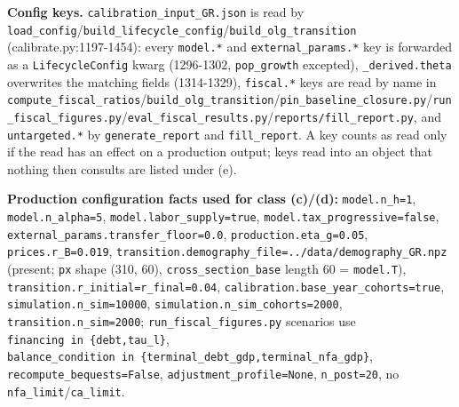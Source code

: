 \textbf{Config keys.} \texttt{calibration\_input\_GR.json} is read by
\texttt{load\_config}/\texttt{build\_lifecycle\_config}/\texttt{build\_olg\_transition}
(calibrate.py:1197-1454): every \texttt{model.*} and
\texttt{external\_params.*} key is forwarded as a
\texttt{LifecycleConfig} kwarg (1296-1302, \texttt{pop\_growth}
excepted), \texttt{\_derived.theta} overwrites the matching fields
(1314-1329), \texttt{fiscal.*} keys are read by name in
\texttt{compute\_fiscal\_ratios}/\texttt{build\_olg\_transition}/\texttt{pin\_baseline\_closure.py}/\texttt{run\_fiscal\_figures.py}/\texttt{eval\_fiscal\_results.py}/\texttt{reports/fill\_report.py},
and \texttt{untargeted.*} by \texttt{generate\_report} and
\texttt{fill\_report}. A key counts as read only if the read has an
effect on a production output; keys read into an object that nothing
then consults are listed under (e).

\textbf{Production configuration facts used for class (c)/(d):}
\texttt{model.n\_h=1}, \texttt{model.n\_alpha=5},
\texttt{model.labor\_supply=true},
\texttt{model.tax\_progressive=false},
\texttt{external\_params.transfer\_floor=0.0},
\texttt{production.eta\_g=0.05}, \texttt{prices.r\_B=0.019},
\texttt{transition.demography\_file=../data/demography\_GR.npz}
(present; \texttt{px} shape (310, 60), \texttt{cross\_section\_base}
length 60 = \texttt{model.T}),
\texttt{transition.r\_initial=r\_final=0.04},
\texttt{calibration.base\_year\_cohorts=true},
\texttt{simulation.n\_sim=10000},
\texttt{simulation.n\_sim\_cohorts=2000},
\texttt{transition.n\_sim=2000}; \texttt{run\_fiscal\_figures.py}
scenarios use
\texttt{financing\ in\ \{\textquotesingle{}debt\textquotesingle{},\textquotesingle{}tau\_l\textquotesingle{}\}},
\texttt{balance\_condition\ in\ \{\textquotesingle{}terminal\_debt\_gdp\textquotesingle{},\textquotesingle{}terminal\_nfa\_gdp\textquotesingle{}\}},
\texttt{recompute\_bequests=False}, \texttt{adjustment\_profile=None},
\texttt{n\_post=20}, no \texttt{nfa\_limit}/\texttt{ca\_limit}.

